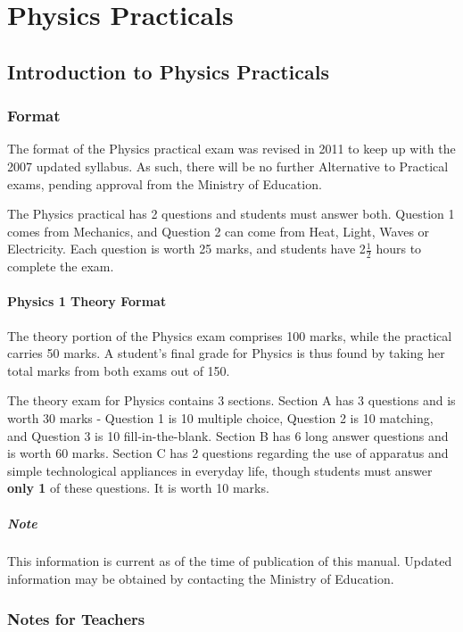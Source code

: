 \chapter{Physics Practicals}

\section{Introduction to Physics Practicals}

\subsection{Format}
The format of the Physics practical exam was revised in 2011 to keep up with the 2007 updated syllabus. As such, there will be no further Alternative to Practical exams, pending approval from the Ministry of Education.

The Physics practical has 2 questions and students must answer both. Question 1 comes from Mechanics, and Question 2 can come from Heat, Light, Waves or Electricity. Each question is worth 25 marks, and students have 2$\frac{1}{2}$ hours to complete the exam.

\subsubsection{Physics 1 Theory Format}
The theory portion of the Physics exam comprises 100 marks, while the practical carries 50 marks. A student's final grade for Physics is thus found by taking her total marks from both exams out of 150.

The theory exam for Physics contains 3 sections. Section A has 3 questions and is worth 30 marks - Question 1 is 10 multiple choice, Question 2 is 10 matching, and Question 3 is 10 fill-in-the-blank. Section B has 6 long answer questions and is worth 60 marks. Section C has 2 questions regarding the use of apparatus and simple technological appliances in everyday life, though students must answer \textbf{only 1} of these questions. It is worth 10 marks.

\paragraph{Note} This information is current as of the time of publication of this manual. Updated information may be obtained by contacting the Ministry of Education. 

\subsection{Notes for Teachers}

